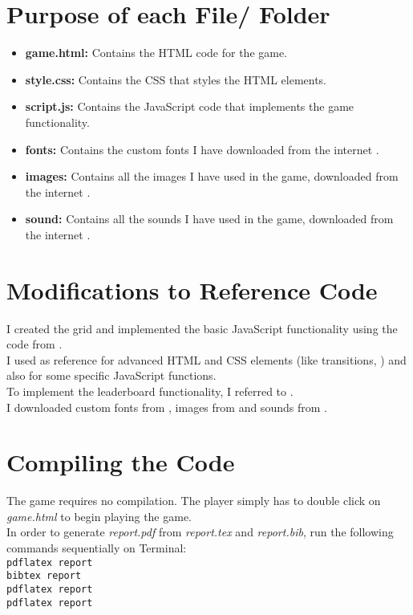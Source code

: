 \documentclass{article}
\begin{document}
\section{Purpose of each File/ Folder}
\begin{itemize}
    \item \textbf{game.html:} Contains the HTML code for the game.
    \item \textbf{style.css:} Contains the CSS that styles the HTML elements.
    \item \textbf{script.js:} Contains the JavaScript code that implements the game functionality.
    \item \textbf{fonts:} Contains the custom fonts I have downloaded from the internet \cite{font-link}.
    \item \textbf{images:} Contains all the images I have used in the game, downloaded from the internet \cite{images-link}.
    \item \textbf{sound:} Contains all the sounds I have used in the game, downloaded from the internet \cite{sounds-link}.
\end{itemize}

\section{Modifications to Reference Code}
I created the grid and implemented the basic JavaScript functionality using the code from \cite{codebase}.\\
I used \cite{w3} as reference for advanced HTML and CSS elements (like transitions, \cite{trans}) and also for some specific JavaScript functions.\\
To implement the leaderboard functionality, I referred to \cite{lead-link}. \\
I downloaded custom fonts from \cite{font-link}, images from \cite{images-link} and sounds from \cite{sounds-link}.

\section{Compiling the Code}
The game requires no compilation. The player simply has to double click on \textit{game.html} to begin playing the game.
\\
In order to generate \textit{report.pdf} from \textit{report.tex} and \textit{report.bib}, run the following commands sequentially on Terminal:
\\
\texttt{pdflatex report} \\
\texttt{bibtex report} \\
\texttt{pdflatex report} \\
\texttt{pdflatex report}



\end{document}

